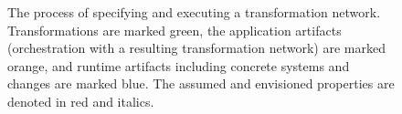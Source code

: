 
\begin{figure}
    \centering
    
    \caption[Process of specifying and executing a transformation network]{The process of specifying and executing a transformation network. 
    Transformations are marked green, the application artifacts (orchestration with a resulting transformation network) are marked orange, and runtime artifacts including concrete systems and changes are marked blue. The assumed and envisioned properties are denoted in red and italics.}
    \label{fig:introduction:process_overview}
\end{figure}

